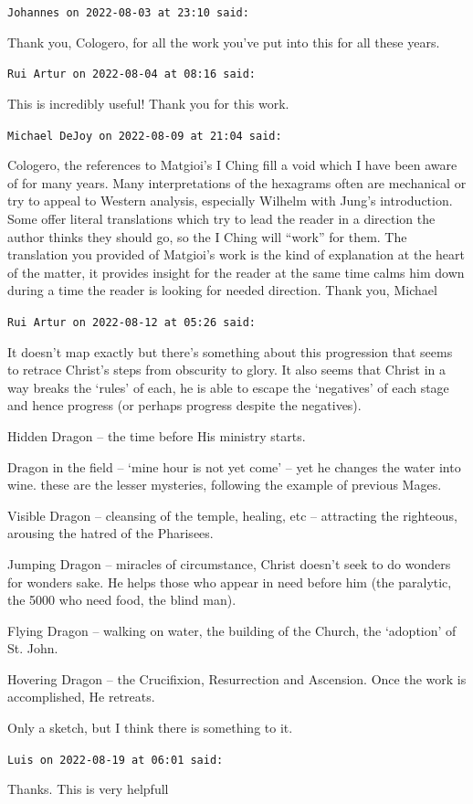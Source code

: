 \begin{footnotesize}
\begin{sffamily}
\texttt{Johannes on 2022-08-03 at 23:10 said:}

Thank you, Cologero, for all the work you've put into this for all these years.

\hfill

\texttt{Rui Artur on 2022-08-04 at 08:16 said:}

This is incredibly useful! Thank you for this work.

\hfill

\texttt{Michael DeJoy on 2022-08-09 at 21:04 said:}

Cologero, the references to Matgioi's I Ching fill a void which I have been aware of for many years. Many interpretations of the hexagrams often are mechanical or try to appeal to Western analysis, especially Wilhelm with Jung's introduction. Some offer literal translations which try to lead the reader in a direction the author thinks they should go, so the I Ching will ``work'' for them. The translation you provided of Matgioi's work is the kind of explanation at the heart of the matter, it provides insight for the reader at the same time calms him down during a time the reader is looking for needed direction. Thank you, Michael

\hfill

\texttt{Rui Artur on 2022-08-12 at 05:26 said:}

It doesn't map exactly but there's something about this progression that seems to retrace Christ's steps from obscurity to glory. It also seems that Christ in a way breaks the `rules' of each, he is able to escape the `negatives' of each stage and hence progress (or perhaps progress despite the negatives).

Hidden Dragon -- the time before His ministry starts.

Dragon in the field -- `mine hour is not yet come' -- yet he changes the water into wine. these are the lesser mysteries, following the example of previous Mages.

Visible Dragon -- cleansing of the temple, healing, etc -- attracting the righteous, arousing the hatred of the Pharisees.

Jumping Dragon -- miracles of circumstance, Christ doesn't seek to do wonders for wonders sake. He helps those who appear in need before him (the paralytic, the 5000 who need food, the blind man).

Flying Dragon -- walking on water, the building of the Church, the `adoption' of St. John.

Hovering Dragon -- the Crucifixion, Resurrection and Ascension. Once the work is accomplished, He retreats.

Only a sketch, but I think there is something to it.

\hfill

\texttt{Luis on 2022-08-19 at 06:01 said:}

Thanks. This is very helpfull


\hfill

\end{sffamily}
\end{footnotesize}

